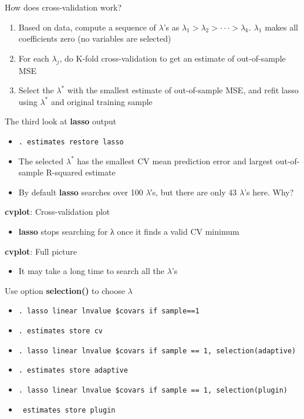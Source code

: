 \documentclass{beamer}
\newcommand{\st}[1]{\small{\texttt{#1}}}
\begin{document}
\begin{frame}{How does cross-validation work?}
	\begin{enumerate}
		\item Based on data, compute a sequence of $\lambda$’s as $\lambda_1 > \lambda_2 > ··· > \lambda_k$. $\lambda_1$ makes all coefficients zero (no variables are selected)
		\item For each $\lambda_j$, do K-fold cross-validation to get an estimate of out-of-sample MSE
		\item Select the $\lambda^*$ with the smallest estimate of out-of-sample MSE, and refit lasso using $\lambda^*$ and original training sample
	\end{enumerate}
\end{frame}

\begin{frame}{The third look at \textbf{lasso} output}
	\begin{itemize}
		\item [] \small{\texttt{. estimates restore lasso}}
	\end{itemize}
	\begin{itemize}
		\item The selected $\lambda^*$ has the smallest CV mean prediction error and largest out-of-sample R-squared estimate
		\item By default \textbf{lasso} searches over 100 $\lambda$′s, but there are only 43 $\lambda$’s here. Why?
	\end{itemize}
\end{frame}

\begin{frame}{\textbf{cvplot}: Cross-validation plot}
	\begin{itemize}
		\item \textbf{lasso} stops searching for λ once it finds a valid CV minimum
	\end{itemize}
\end{frame}

\begin{frame}{\textbf{cvplot}: Full picture}
	\begin{itemize}
		\item It may take a long time to search all the $\lambda$’s
	\end{itemize}
\end{frame}

\begin{frame}{Use option \textbf{selection()} to choose $\lambda$}
	\begin{itemize}
		\item [] \st{. lasso linear lnvalue \$covars if sample==1}
		\item [] \st{. estimates store cv}
		\item [] \st{. lasso linear lnvalue \$covars if sample == 1, selection(adaptive)}
		\item [] \st{. estimates store adaptive}
		\item [] \st{. lasso linear lnvalue \$covars if sample == 1, selection(plugin)}
		\item [] \st{ estimates store plugin}
	\end{itemize}
\end{frame}
\end{document}
